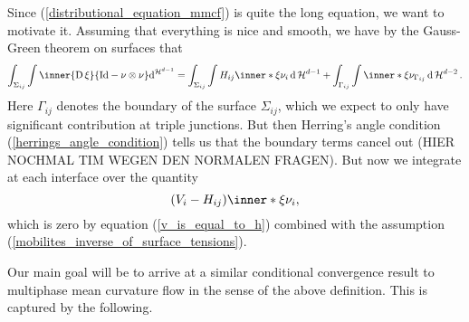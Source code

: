 	Since (\ref{distributional_equation_mmcf}) is quite the long equation, we want to motivate it. Assuming that everything is nice and smooth, we have by the Gauss-Green theorem on surfaces \cite[Thm.~11.8]{maggi_sets_of_finite_perimeter} that
	\begin{equation*}
		\int_{ \Sigma_{ i j } }
			\int 
				\inner{ \diff \xi }{ \mathrm{Id} - \nu \otimes \nu }
			\dd^{\hm^{ d- 1 }}
		=
		\int_{ \Sigma_{ i j } }
			\int
				H_{ i j } \inner*{ \xi }{ \nu_{ i } }
			\dd{\hm^{ d- 1 }}
		+
		\int_{ \Gamma_{ i j } }
			\int
				\inner*{ \xi }{ \nu_{ \Gamma_{ i j } } }
			\dd{ \hm^{ d - 2 } }.
	\end{equation*}
	Here $ \Gamma_{ i j } $ denotes the boundary of the surface $ \Sigma_{ i j 
	} $, which we expect to only have significant contribution at triple 
	junctions. But then Herring's angle condition 
	(\ref{herrings_angle_condition}) tells us that the boundary terms cancel 
	out (HIER NOCHMAL TIM WEGEN DEN NORMALEN FRAGEN). But now we integrate at 
	each interface over the quantity
	\begin{equation*}
		(V_{ i } - H_{ i j } ) \inner*{ \xi }{ \nu_{ i } },
	\end{equation*}
	which is zero by equation (\ref{v_is_equal_to_h}) combined with the 
	assumption (\ref{mobilites_inverse_of_surface_tensions}).
	
	Our main goal will be to arrive at a similar conditional convergence result 
	to multiphase mean curvature flow in the sense of the above definition. 
	This is captured by the following.
	
